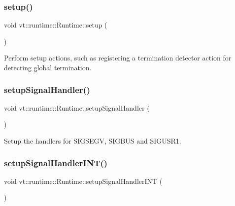 \subsubsection{\texorpdfstring{setup()}{setup()}}
{\footnotesize\ttfamily void vt\+::runtime\+::\+Runtime\+::setup (\begin{DoxyParamCaption}{ }\end{DoxyParamCaption})\hspace{0.3cm}{\ttfamily [protected]}}



Perform setup actions, such as registering a termination detector action for detecting global termination. 

\mbox{\label{structvt_1_1runtime_1_1_runtime_af87ef11218f0c1d095dcdcd4cfe4521e}} 
\subsubsection{\texorpdfstring{setup\+Signal\+Handler()}{setupSignalHandler()}}
{\footnotesize\ttfamily void vt\+::runtime\+::\+Runtime\+::setup\+Signal\+Handler (\begin{DoxyParamCaption}{ }\end{DoxyParamCaption})\hspace{0.3cm}{\ttfamily [protected]}}



Setup the handlers for S\+I\+G\+S\+E\+GV, S\+I\+G\+B\+US and S\+I\+G\+U\+S\+R1. 

\mbox{\label{structvt_1_1runtime_1_1_runtime_a382e68597ae7acb16bdb9f1c3ab4f010}} 
\subsubsection{\texorpdfstring{setup\+Signal\+Handler\+I\+N\+T()}{setupSignalHandlerINT()}}
{\footnotesize\ttfamily void vt\+::runtime\+::\+Runtime\+::setup\+Signal\+Handler\+I\+NT (\begin{DoxyParamCaption}{ }\end{DoxyParamCaption})\hspace{0.3cm}{\ttfamily [protected]}}



